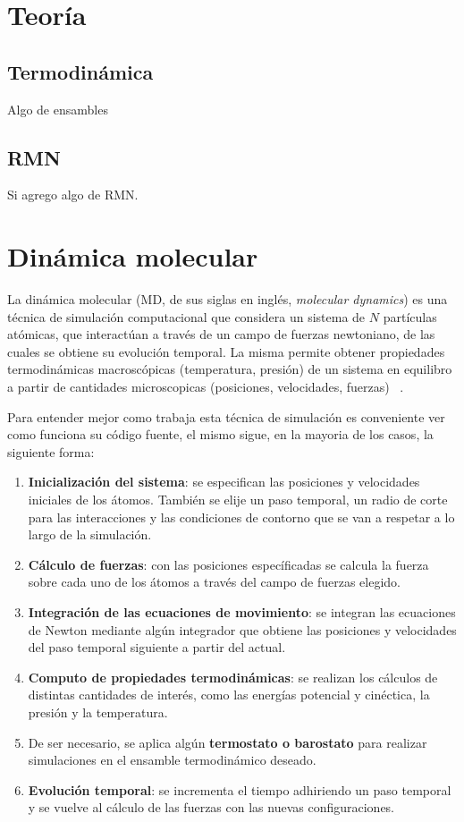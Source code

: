 \section{Teoría}

\subsection{Termodinámica}

Algo de ensambles

\subsection{RMN}

Si agrego algo de RMN.


\section{Dinámica molecular}

La dinámica molecular (MD, de sus siglas en inglés, \textit{molecular dynamics})
es una técnica de simulación computacional que considera un sistema de $N$
partículas atómicas, que interactúan a través de un campo de fuerzas newtoniano,
de las cuales se obtiene su evolución temporal. La misma permite obtener
propiedades termodinámicas macroscópicas (temperatura, presión) de un sistema en 
equilibro a partir de cantidades microscopicas (posiciones, velocidades, fuerzas)
~\cite{frenkel2001, allen2017}.

Para entender mejor como trabaja esta técnica de simulación es conveniente ver
como funciona su código fuente, el mismo sigue, en la mayoria de los casos, la
siguiente forma:
\begin{enumerate}
    \item \textbf{Inicialización del sistema}: se especifican las posiciones y
        velocidades iniciales de los átomos. También se elije un paso temporal, 
        un radio de corte para las interacciones y las condiciones de contorno que
        se van a respetar a lo largo de la simulación. 
    \item \textbf{Cálculo de fuerzas}: con las posiciones específicadas se
        calcula la fuerza sobre cada uno de los átomos a través del campo de 
        fuerzas elegido.
    \item \textbf{Integración de las ecuaciones de movimiento}: se integran las
        ecuaciones de Newton mediante algún integrador que obtiene las posiciones
        y velocidades del paso temporal siguiente a partir del actual.
    \item \textbf{Computo de propiedades termodinámicas}: se realizan los
        cálculos de distintas cantidades de interés, como las energías potencial
        y cinéctica, la presión y la temperatura.
    \item De ser necesario, se aplica algún \textbf{termostato o barostato}
        para realizar simulaciones en el ensamble termodinámico deseado.
    \item \textbf{Evolución temporal}: se incrementa el tiempo adhiriendo un
        paso temporal y se vuelve al cálculo de las fuerzas con las nuevas 
        configuraciones.
\end{enumerate}

